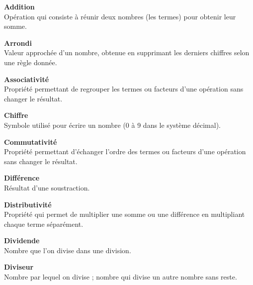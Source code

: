  \vfill
\begin{tcbraster}[raster columns=2, raster equal height, raster valign=top,raster column skip=2mm, raster row skip=2mm]
\begin{terme}
\textbf{\large Addition}\\[2pt]
{\small Opération qui consiste à réunir deux nombres (les termes) pour obtenir leur somme.}
\end{terme}
\begin{terme}
\textbf{\large Arrondi}\\[2pt]
{\small Valeur approchée d'un nombre, obtenue en supprimant les derniers chiffres selon une règle donnée.}
\end{terme}
\begin{terme}
\textbf{\large Associativité}\\[2pt]
{\small Propriété permettant de regrouper les termes ou facteurs d'une opération sans changer le résultat.}
\end{terme}
\begin{terme}
\textbf{\large Chiffre}\\[2pt]
{\small Symbole utilisé pour écrire un nombre (0 à 9 dans le système décimal).}
\end{terme}
\begin{terme}
\textbf{\large Commutativité}\\[2pt]
{\small Propriété permettant d'échanger l'ordre des termes ou facteurs d'une opération sans changer le résultat.}
\end{terme}
\begin{terme}
\textbf{\large Différence}\\[2pt]
{\small Résultat d'une soustraction.}
\end{terme}
\begin{terme}
\textbf{\large Distributivité}\\[2pt]
{\small Propriété qui permet de multiplier une somme ou une différence en multipliant chaque terme séparément.}
\end{terme}
\begin{terme}
\textbf{\large Dividende}\\[2pt]
{\small Nombre que l'on divise dans une division.}
\end{terme}
\begin{terme}
\textbf{\large Diviseur}\\[2pt]
{\small Nombre par lequel on divise ; nombre qui divise un autre nombre sans reste.}
\end{terme}
\begin{terme}

\end{terme}
\end{tcbraster}
